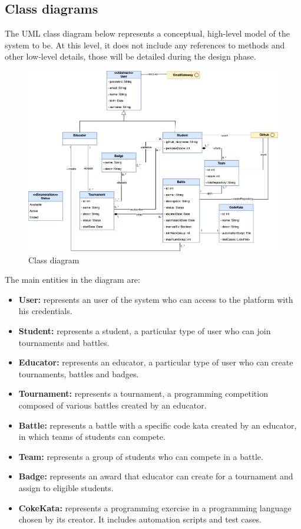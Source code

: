 \subsection{Class diagrams}
The UML class diagram below represents a conceptual, high-level model of the system to be. 
At this level, it does not include any references to methods and other low-level details, those will be detailed during the design phase. \\

\begin{figure}[H]
      \centering
      \includegraphics[width=1\textwidth]{images/Class_Diagram.png}
      \caption{Class diagram}
\end{figure}

The main entities in the diagram are:
\begin{itemize}
    \item \textbf{User:} represents an user of the system who can access to the platform with his credentials.
    \item \textbf{Student:} represents a student, a particular type of user who can join tournaments and battles.
    \item \textbf{Educator:} represents an educator, a particular type of user who can create tournaments, battles and badges.
    \item \textbf{Tournament:} represents a tournament, a programming competition composed of various battles created by an educator.
    \item \textbf{Battle:} represents a battle with a specific code kata created by an educator, in which teams of students can compete.
    \item \textbf{Team: } represents a group of students who can compete in a battle.
    \item \textbf{Badge: } represents an award that educator can create for a tournament and assign to eligible students.
    \item \textbf{CokeKata: } represents a programming exercise in a programming language chosen by its creator. 
    It includes automation scripts and test cases.
\end{itemize}

